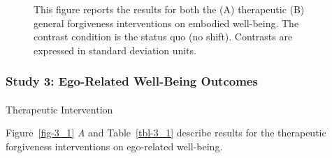 \documentclass[
  single column]{article}
\makeatletter
\let\oldparagraph\paragraph
\renewcommand{\paragraph}{
    \@ifstar
      \xxxParagraphStar
      \xxxParagraphNoStar
  }
\newcommand{\xxxParagraphStar}[1]{\oldparagraph*{#1}\mbox{}}
\newcommand{\xxxParagraphNoStar}[1]{\oldparagraph{#1}\mbox{}}
\makeatother
\begin{document}
\begin{figure}


\caption{\label{fig-2_1}This figure reports the results for both the (A)
therapeutic (B) general forgiveness interventions on embodied
well-being. The contrast condition is the status quo (no shift).
Contrasts are expressed in standard deviation units.}

\end{figure}%

\newpage{}

\subsubsection{Study 3: Ego-Related Well-Being
Outcomes}\label{study-3-ego-related-well-being-outcomes}

\paragraph{Therapeutic Intervention}\label{therapeutic-intervention-2}

Figure~\ref{fig-3_1} \emph{A} and Table~\ref{tbl-3_1} describe results
for the therapeutic forgiveness interventions on ego-related well-being.
\end{document}
